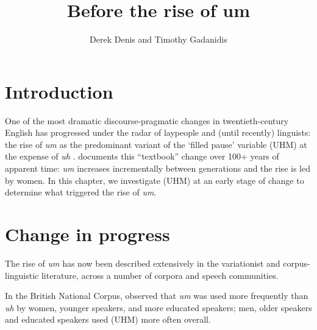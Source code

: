 \documentclass{article}
\title{Before the rise of um}
\author{Derek Denis and Timothy Gadanidis}
\begin{document}
\maketitle

\section{Introduction}


One of the most dramatic discourse-pragmatic changes in twentieth-century
English has progressed under the radar of laypeople and (until recently)
linguists: the rise of \emph{um} as the predominant variant of the `filled
pause' variable (UHM) at the expense of \emph{uh} \parencite{tottie2011,
fruehwald2016, wielingetal2016}.
\textcite[43]{fruehwald2016} documents this ``textbook'' change over 100+ years
of apparent time:
\emph{um} increases incrementally between generations and the rise is led by
women.
In this chapter, we investigate (UHM) at an early stage of change to determine
what triggered the rise of \emph{um}.

\section{Change in progress}

The rise of \emph{um} has now been described extensively in the variationist and
corpus-linguistic literature, across a number of corpora and speech communities.


In the British National Corpus, \textcite{tottie2011} observed that \emph{um}
was used more frequently than \emph{uh} by women, younger speakers, and more
educated speakers; men, older speakers and educated speakers used (UHM) more
often overall.
\textcite{fruehwald2016}

\end{document}
